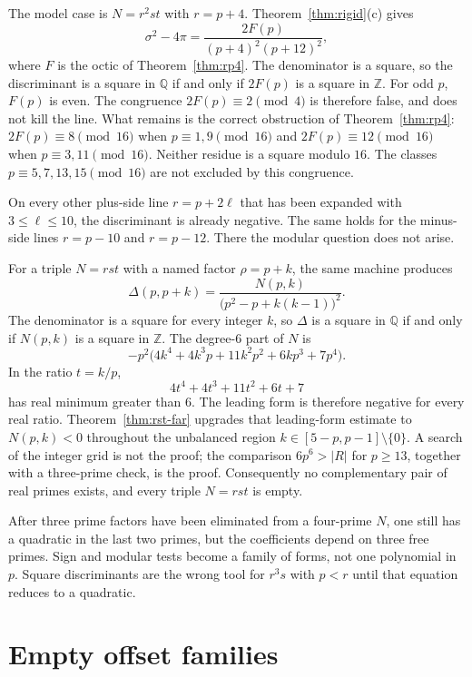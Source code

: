 \documentclass[11pt,reqno]{amsart}
\theoremstyle{definition}
\begin{document}
The model case is \(N=r^2st\) with \(r=p+4\). Theorem~\ref{thm:rigid}(c) gives
\[
\sigma^2-4\pi=\frac{2F(p)}{(p+4)^2(p+12)^2},
\]
where \(F\) is the octic of Theorem~\ref{thm:rp4}. The denominator is a square, so the discriminant is a square in \(\mathbb{Q}\) if and only if \(2F(p)\) is a square in \(\mathbb{Z}\). For odd \(p\), \(F(p)\) is even. The congruence \(2F(p)\equiv 2\pmod{4}\) is therefore false, and does not kill the line. What remains is the correct obstruction of Theorem~\ref{thm:rp4}: \(2F(p)\equiv 8\pmod{16}\) when \(p\equiv 1,9\pmod{16}\) and \(2F(p)\equiv 12\pmod{16}\) when \(p\equiv 3,11\pmod{16}\). Neither residue is a square modulo \(16\). The classes \(p\equiv 5,7,13,15\pmod{16}\) are not excluded by this congruence.

On every other plus-side line \(r=p+2\ell\) that has been expanded with \(3\le\ell\le 10\), the discriminant is already negative. The same holds for the minus-side lines \(r=p-10\) and \(r=p-12\). There the modular question does not arise.

For a triple \(N=rst\) with a named factor \(\rho=p+k\), the same machine produces
\[
\Delta(p,p+k)=\frac{N(p,k)}{\bigl(p^2-p+k(k-1)\bigr)^2}.
\]
The denominator is a square for every integer \(k\), so \(\Delta\) is a square in \(\mathbb{Q}\) if and only if \(N(p,k)\) is a square in \(\mathbb{Z}\). The degree-\(6\) part of \(N\) is
\[
-p^2\bigl(4k^4+4k^3p+11k^2p^2+6kp^3+7p^4\bigr).
\]
In the ratio \(t=k/p\),
\[
4t^4+4t^3+11t^2+6t+7
\]
has real minimum greater than \(6\). The leading form is therefore negative for every real ratio. Theorem~\ref{thm:rst-far} upgrades that leading-form estimate to \(N(p,k)<0\) throughout the unbalanced region \(k\in[5-p,p-1]\setminus\{0\}\). A search of the integer grid is not the proof; the comparison \(6p^6>\lvert R\rvert\) for \(p\ge 13\), together with a three-prime check, is the proof. Consequently no complementary pair of real primes exists, and every triple \(N=rst\) is empty.

After three prime factors have been eliminated from a four-prime \(N\), one still has a quadratic in the last two primes, but the coefficients depend on three free primes. Sign and modular tests become a family of forms, not one polynomial in \(p\). Square discriminants are the wrong tool for \(r^3s\) with \(p<r\) until that equation reduces to a quadratic.

\section{Empty offset families}
\label{sec:offsets}
\end{document}
